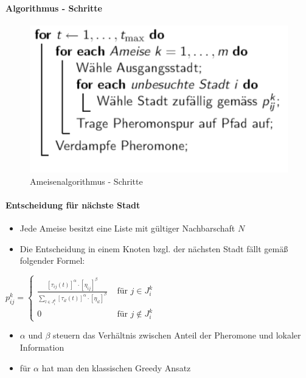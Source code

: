 \paragraph{Algorithmus - Schritte}
\begin{figure}[H]
	\begin{center}
		\includegraphics[scale=0.5]{Resources/PNG/ACO.PNG}
		\caption{Ameisenalgorithmus - Schritte}
		\label{fig:PNG/ACO.PNG}
	\end{center}
\end{figure}
\paragraph{Entscheidung für nächste Stadt}
\begin{itemize}
	\item Jede Ameise besitzt eine Liste mit gültiger Nachbarschaft $N$
	\item Die Entscheidung in einem Knoten bzgl. der nächsten Stadt fällt gemäß folgender Formel:
\end{itemize}
$p_{i j}^{k}=\left\{\begin{array}{ll}{\frac{\left[\tau_{i j}(t)\right]^{\alpha} \cdot\left[\eta_{i j}\right]^{\beta}}{\sum_{l \in J_{i}^{k}}\left[\tau_{i l}(t)\right]^{\alpha} \cdot\left[\eta_{i l}\right]^{\beta}}} & {\text { für } j \in J_{i}^{k}} \\ {0} & {\text { für } j \notin J_{i}^{k}}\end{array}\right.$
\begin{itemize}
	\item $\alpha$ und $\beta$ steuern das Verhältnis zwischen Anteil der Pheromone und lokaler Information
	\item für $\alpha$ hat man den klassischen Greedy Ansatz
\end{itemize}


